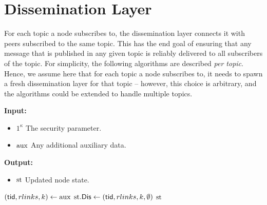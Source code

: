 \section{Dissemination Layer}
\label{sec:dissemination}

For each topic a node subscribes to, the dissemination layer connects it with peers subscribed to the same topic. This has the end goal of ensuring that any message that is published in any given topic is reliably delivered to all subscribers of the topic. For simplicity, the following algorithms are described \emph{per topic}. Hence, we assume here that for each topic a node subscribes to, it needs to spawn a fresh dissemination layer for that topic -- however, this choice is arbitrary, and the algorithms could be extended to handle multiple topics. 

\begin{algorithm}[H]
\caption{\dissetup}
\label{alg:dissetup}
\textbf{Input:}
\begin{itemize}
\vspace{-.8em}
\itemsep0em 
    \item $1^\kappa$ The security parameter.
    \item $\text{aux}$ Any additional auxiliary data.
\end{itemize}
\textbf{Output:}
\begin{itemize}
\vspace{-.8em}
\itemsep0em 
    \item $\text{st}$ Updated node state.
\end{itemize}
\begin{algorithmic}
    \State $(\mathsf{tid},rlinks,k) \gets \text{aux}$
    \State $\text{st}.\mathsf{Dis} \gets (\mathsf{tid},rlinks,k,\emptyset)$
    \State \return $\text{st}$
\end{algorithmic}
\end{algorithm}


